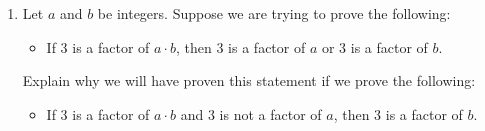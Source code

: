 \begin{prog}
\begin{enumerate}
\item Let $a$  and  $b$  be integers.  Suppose we are trying to prove the following:
\begin{itemize} 
\item If  3  is a factor of  $a \cdot b$, then  3  is a factor of  $a$  or  3  is a factor of   $b$.
\end{itemize}
Explain why we will have proven this statement if we prove the following:
\begin{itemize}
\item If  3  is a factor of $a \cdot b$ and  3  is not a factor of   $a$, then  3  is a factor of   $b$.
\end{itemize}
\end{enumerate}
\end{prog}
\hbreak
